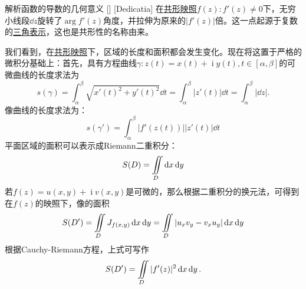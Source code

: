 \documentclass[UTF8]{ctexart}
\DeclareMathOperator{\ii}{\mathrm{i}}
\newcommand{\AngularForm}{\hyperref[dfn:AngularForm]{三角表示}}
\newcommand{\ConformalMapping}{\hyperref[dfn:ConformalMapping]{共形映照}}
\begin{document}
\begin{crl}
    [UUID]
    {解析函数的导数的几何意义}
    []
    [Dedicatia]
    在\ConformalMapping $f(z): f'(z)\neq 0$下，无穷小线段$\dd{z}$旋转了$\arg f'(z)$角度，并拉伸为原来的$|f'(z)|$倍。这一点起源于复数的\AngularForm，这也是共形性的名称由来。
\end{crl}
我们看到，在\ConformalMapping 下，区域的长度和面积都会发生变化。现在将这置于严格的微积分基础上：首先，具有方程曲线$\gamma:z(t)=x(t)+\ii y(t), t\in[\alpha,\beta]$的可微曲线的长度求法为
\[s(\gamma)=\int_\alpha^\beta\sqrt{x'(t)^2+y'(t)^2}\dd{t}=\int_{\alpha}^{\beta}|z'(t)|\dd{t}=\int_{\alpha}^\beta|\dd{z}|. \]
像曲线的长度求法为：
\[s(\gamma')=\int_{\alpha}^{\beta}|f'(z(t))||z'(t)|\dd{t}\]
平面区域的面积可以表示成Riemann二重积分：
\[S(D)=\iintop_D\dd{x}\dd{y}\]
若$f(z)=u(x,y)+\ii v(x,y)$是可微的，那么根据二重积分的换元法，可得到在$f(z)$的映照下，像的面积
\[S(D')=\iintop_{D} J_{f(x,y)}\dd{x}\dd{y}=\iintop_{D}|u_xv_y-v_xu_y|\dd{x}\dd{y}\]
根据Cauchy-Riemann方程，上式可写作
\[S(D')=\iintop_{D}|f'(z)|^2\dd{x}\dd{y}.\]
\end{document}
